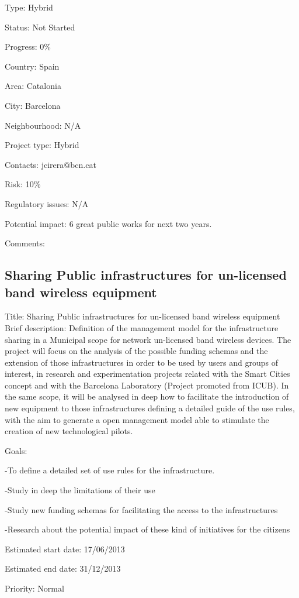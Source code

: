 \documentclass[draftclsnofoot,12pt,journal,onecolumn]{IEEEtran}
\begin{document}
Type: Hybrid 

Status: Not Started 

Progress: 0\% 

Country: Spain 

Area: Catalonia 

City: Barcelona 

Neighbourhood: N/A 

Project type: Hybrid 

Contacts: jcirera@bcn.cat

Risk: 10\% 

Regulatory issues: N/A 

Potential impact: 6 great public works for next two years. 

Comments: 

\subsection{Sharing Public infrastructures for un-licensed band wireless equipment} 
Title: Sharing Public infrastructures for un-licensed band wireless equipment 
Brief description: Definition of the management model for the infrastructure 
sharing in a Municipal scope for network un-licensed band wireless devices. 
The project will focus on the analysis of the possible funding schemas and 
the extension of those infrastructures in order to be used by users and 
groups of interest, in research and experimentation projects related with the 
Smart Cities concept and with the Barcelona Laboratory (Project promoted from 
ICUB). In the same scope, it will be analysed in deep how to facilitate the 
introduction of new equipment to those infrastructures defining a detailed 
guide of the use rules, with the aim to generate a open management model able 
to stimulate the creation of new technological pilots. 

Goals: 

-To define a detailed set of use rules for the infrastructure. 

-Study in deep the limitations of their use 

-Study new funding schemas for facilitating the access to the infrastructures 

-Research about the potential impact of these kind of initiatives for the 
citizens 

Estimated start date: 17/06/2013 

Estimated end date: 31/12/2013 

Priority: Normal 
\end{document}
